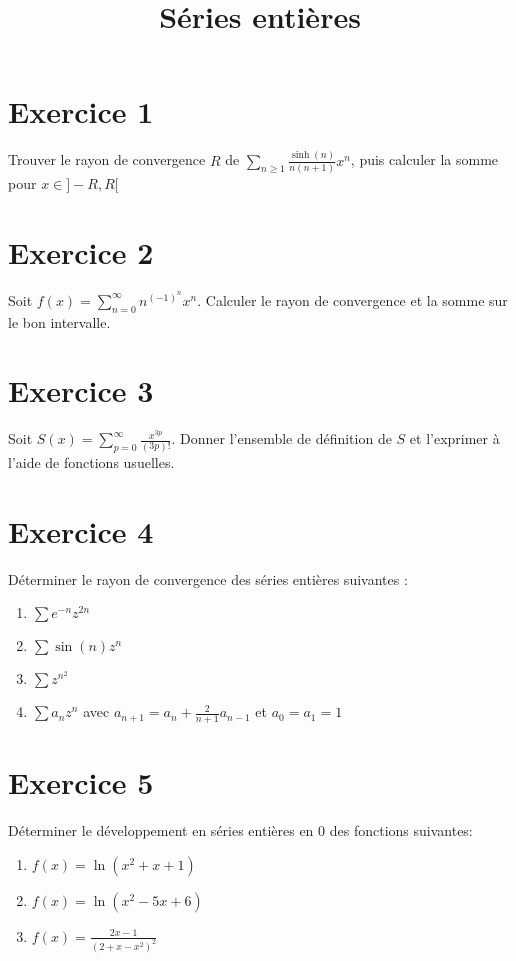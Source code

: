 \documentclass[11pt]{article}
\author{\Name \texttt{\Login}}
\date{}
\title{Séries entières}
\begin{document}
\maketitle


\section*{Exercice 1}

Trouver le rayon de convergence $R$ de $\sum_{n\geq1} \frac{\sinh(n)}{n(n+1)}x^n$, puis calculer la somme pour $x\in ]-R,R[$

\section*{Exercice 2}

Soit $f(x) = \sum_{n=0}^\infty n^{(-1)^n}x^n$. Calculer le rayon de convergence et la somme sur le bon intervalle.

\section*{Exercice 3}

Soit $S(x) = \sum_{p=0}^\infty \frac{x^{3p}}{(3p)!} $. Donner l'ensemble de définition de $S$ et l'exprimer à l'aide de fonctions usuelles.

\section*{Exercice 4}

Déterminer le rayon de convergence des séries entières suivantes :

\begin{enumerate}
\item $\sum e^{-n}z^{2n}$
\item $\sum \sin(n)z^{n}$
\item $\sum z^{n^2}$
\item $\sum a_n z^{n}$ avec $a_{n+1}=a_n + \frac{2}{n+1}a_{n-1}$ et $ a_0=a_1=1$
\end{enumerate}

\section*{Exercice 5}

Déterminer le développement en séries entières en $0$ des fonctions suivantes:

\begin{enumerate}
\item $f(x) = \ln(x^2 +x +1)$
\item $f(x)= \ln(x^2 -5x +6)$
\item $f(x) = \frac{2x-1}{(2+x-x^2)^2}$
\end{enumerate}
\end{document}
